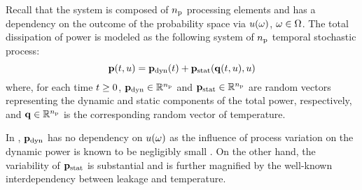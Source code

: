 Recall that the system is composed of ${n_\text{p}}$ processing elements and has a dependency on the outcome of the probability space via $u(\omega)$, $\omega \in \Omega$.
The total dissipation of power is modeled as the following system of ${n_\text{p}}$ temporal stochastic process:
\begin{equation} \elabel{power-model}
  \vP(\t, \u) = \vP_\dynamic(\t) + \vP_\static(\vQ(\t, \u), \u)
\end{equation}
where, for each time $t \geq 0$, $\mathbf{p}_{\text{dyn}} \in \mathbb{R}^{n_\text{p}}$ and $\mathbf{p}_{\text{stat}} \in \mathbb{R}^{n_\text{p}}$ are random vectors representing the dynamic and static components of the total power, respectively, and $\mathbf{q} \in \mathbb{R}^{n_\text{p}}$ is the corresponding random vector of temperature.
\begin{remark}
In , \textnormal{$\mathbf{p}_{\text{dyn}}$} has no dependency on $u(\omega)$ as the influence of process variation on the dynamic power is known to be negligibly small \cite{srivastava2010}.
On the other hand, the variability of \textnormal{$\mathbf{p}_{\text{stat}}$} is substantial and is further magnified by the well-known interdependency between leakage and temperature.
\end{remark}
